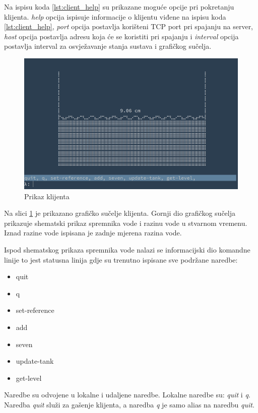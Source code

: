 Na ispisu koda \ref{lst:client_help} su prikazane moguće opcije pri pokretanju
klijenta. \emph{help} opcija ispisuje informacije o klijentu viđene na ispisu
koda \ref{lst:client_help}, \emph{port} opcija postavlja korišteni TCP port pri
spajanju na server, \emph{host} opcija postavlja adresu koja će se koristiti pri
spajanju i \emph{interval} opcija postavlja interval za osvježavanje stanja
sustava i grafičkog sučelja.

\begin{figure}[H]
\centering
\includegraphics[scale=0.25]{figures/arclient-2.png}
\caption{Prikaz klijenta}
\label{fig:client}
\end{figure}

Na slici \ref{fig:client} je prikazano grafičko sučelje klijenta. Gornji dio
grafičkog sučelja prikazuje shematski prikaz spremnika vode i razinu vode u
stvarnom vremenu. Iznad razine vode ispisana je zadnje mjerena razina vode.

Ispod shematskog prikaza spremnika vode nalazi se informacijski dio komandne
linije to jest statusna linija gdje su trenutno ispisane sve podržane naredbe:
\begin{itemize}
    \item quit
    \item q
    \item set-reference
    \item add
    \item seven
    \item update-tank
    \item get-level
\end{itemize}

Naredbe su odvojene u lokalne i udaljene naredbe. Lokalne naredbe su: \emph{quit}
i \emph{q}. Naredba \emph{quit} služi za gašenje klijenta, a naredba \emph{q} je
samo alias na naredbu \emph{quit}.

